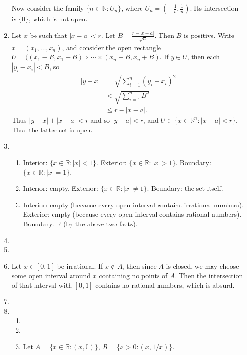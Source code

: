 \documentclass{article}
\begin{document}
\begin{enumerate}[label=\textbf{1-\arabic*.}]
Now consider the family $\{n\in\mathbb N: U_n\}$, where $U_n = (-\frac{1}{n},\frac{1}{n})$. Its intersection is $\{0\}$, which is not open.
\item Let $x$ be such that $|x-a|<r$. Let $B=\frac{r-|x-a|}{\sqrt{n}}$. Then $B$ is positive. Write $x=(x_1, \ldots, x_n)$, and consider the open rectangle $U=((x_1-B,x_1+B)\times\cdots\times (x_n-B,x_n+B)$. If $y\in U$, then each $|y_i - x_i| < B$, so 
\begin{align*}
|y-x| &= \sqrt{\sum_{i=1}^n (y_i - x_i) ^2}\\
	& < \sqrt{\sum_{i=1}^n B^2}\\
	& \leq r - |x-a|.
\end{align*}
Thus $|y-x| + |x-a| < r$ and so $|y-a| < r$, and $U\subset \{x\in\mathbb R^n:|x-a|<r\}$. Thus the latter set is open.
\item
\begin{enumerate}
\item Interior: $\{x\in\mathbb R: |x|<1\}$. Exterior: $\{x\in\mathbb R: |x|>1\}$. Boundary: $\{x\in\mathbb R: |x|=1\}$.
\item Interior: empty. Exterior: $\{x\in\mathbb R: |x|\neq 1\}$. Boundary: the set itself.
\item Interior: empty (because every open interval contains irrational numbers). Exterior: empty (because every open interval contains rational numbers). Boundary: $\mathbb R$ (by the above two facts).
\end{enumerate}
\item
\item
\item Let $x\in[0,1]$ be irrational. If $x\notin A$, then since $A$ is closed, we may choose some open interval around $x$ containing no points of $A$. Then the intersection of that interval with $[0,1]$ contains no rational numbers, which is absurd.
\item
\item
\begin{enumerate}
\item
\item
\item Let $A=\{x\in \mathbb R:(x,0)\}$, $B=\{x>0:(x,1/x)\}$.
\end{enumerate}
\end{enumerate}
\end{document}
